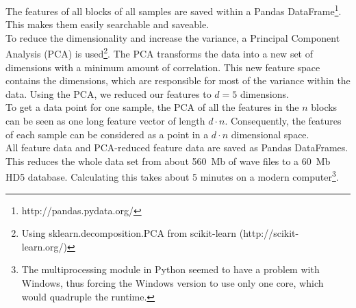 The features of all blocks of all samples are saved within a Pandas DataFrame\footnote{http://pandas.pydata.org/}. This makes them easily searchable and saveable.\\
To reduce the dimensionality and increase the variance, a Principal Component Analysis (PCA) is used\footnote{Using sklearn.decomposition.PCA from scikit-learn (http://scikit-learn.org/)}. The PCA transforms the data into a new set of dimensions with a minimum amount of correlation. This new feature space contains the dimensions, which are responsible for most of the variance within the data. Using the PCA, we reduced our features to $d=5$ dimensions.\\
To get a data point for one sample, the PCA of all the features in the $n$ blocks can be seen as one long feature vector of length $d \cdot n$. Consequently, the features of each sample can be considered as a point in a $d \cdot n$ dimensional space.\\
All feature data and PCA-reduced feature data are saved as Pandas DataFrames. This reduces the whole data set from about 560~Mb of wave files to a 60~Mb HD5 database. Calculating this takes about 5 minutes on a modern computer\footnote{The multiprocessing module in Python seemed to have a problem with Windows, thus forcing the Windows version to use only one core, which would quadruple the runtime.}.
